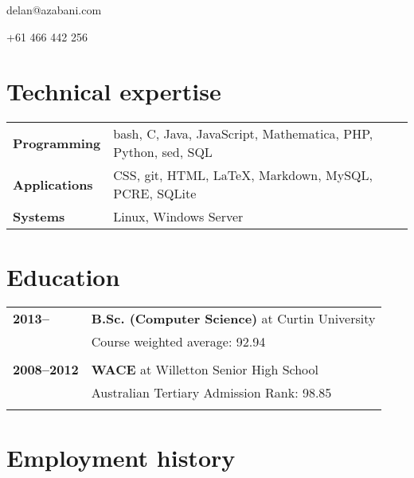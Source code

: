\documentclass[a4paper,12pt]{article}
\begin{document}
\hrulefill

\hspace{1cm}\begin{minipage}{7cm}
	{\Huge delan\textcolor{lg}@azabani\textcolor{lg}{.com}}
\end{minipage}\hfill\begin{minipage}{4cm}
	\hfill	+61 466 442 256	\par
\end{minipage}\hspace{1cm}

\hrulefill

\section*{Technical expertise}

\begin{tabular}{p{3.5cm}p{12.5cm}}
	\textbf{Programming} &
		bash, C, Java, JavaScript, Mathematica, PHP, Python, sed, SQL \\
	\textbf{Applications} &
		CSS, git, HTML, \LaTeX, Markdown, MySQL, PCRE, SQLite \\
	\textbf{Systems} &
		Linux, Windows Server \\
\end{tabular}

\section*{Education}

\begin{tabular}{p{3.5cm}p{12.5cm}}
	\textbf{2013--} &
		\textbf{B.Sc. (Computer Science)} at Curtin University\\
		& Course weighted average: 92.94\\\\
	\textbf{2008--2012} &
		\textbf{WACE} at Willetton Senior High School\\
		& Australian Tertiary Admission Rank: 98.85\\\\
\end{tabular}

\section*{Employment history}
\end{document}
